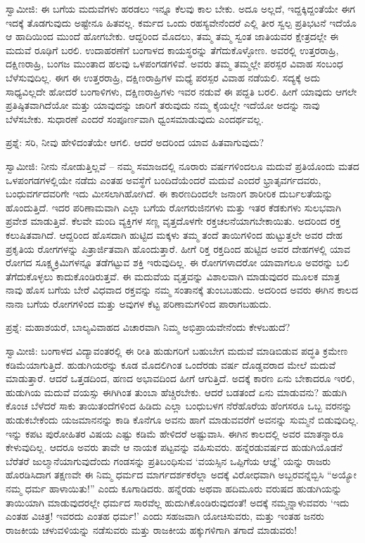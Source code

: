 ಸ್ವಾಮೀಜಿ: ಈ ಬಗೆಯ ಮದುವೆಗಳು ಹರಡಲು ಇನ್ನೂ ಕೆಲವು ಕಾಲ ಬೇಕು. ಅದೂ ಅಲ್ಲದೆ, ಇದ್ದಕ್ಕಿದ್ದಂತೆಯೇ ಈಗ ಇದಕ್ಕೆ ತೊಡಗುವುದು ಅಷ್ಟೇನೂ ಹಿತವಲ್ಲ. ಕರ್ಮದ ಒಂದು ರಹಸ್ಯವೇನೆಂದರೆ ಎಲ್ಲಿ ತೀರ ಸ್ವಲ್ಪ ಪ್ರತಿಭಟನೆ ಇದೆಯೊ ಆ ಹಾದಿಯಿಂದ ಮುಂದೆ ಹೋಗಬೇಕು. ಆದ್ದರಿಂದ ಮೊದಲು, ತಮ್ಮ ತಮ್ಮ ಸ್ವಂತ ಜಾತಿಯವರ ಕ್ಷೇತ್ರದಲ್ಲೇ ಈ ಮದುವೆ ರೂಢಿಗೆ ಬರಲಿ. ಉದಾಹರಣೆಗೆ ಬಂಗಾಳದ ಕಾಯಸ್ಥರನ್ನು ತೆಗೆದುಕೊಳ್ಳೋಣ. ಅವರಲ್ಲಿ ಉತ್ತರರಾಹ್ರಿ, ದಕ್ಷಿಣರಾಹ್ರಿ, ಬಂಗಜ ಮುಂತಾದ ಹಲವು ಒಳಪಂಗಡಗಳಿವೆ. ಅವರು ತಮ್ಮ ತಮ್ಮಲ್ಲೇ ಪರಸ್ಪರ ವಿವಾಹ ಸಂಬಂಧ ಬೆಳೆಸುವುದಿಲ್ಲ. ಈಗ ಈ ಉತ್ತರರಾಹ್ರಿ, ದಕ್ಷಿಣರಾಹ್ರಿಗಳ ಮಧ್ಯೆ ಪರಸ್ಪರ ವಿವಾಹ ನಡೆಯಲಿ. ಸದ್ಯಕ್ಕೆ ಅದು ಸಾಧ್ಯವಿಲ್ಲದೇ ಹೋದರೆ ಬಂಗಾಳಿಗಳು, ದಕ್ಷಿಣರಾಹ್ರಿಗಳು ಇವರ ನಡುವೆ ಈ ಪದ್ದತಿ ಬರಲಿ. ಹೀಗೆ ಯಾವುದು ಆಗಲೇ ಪ್ರತಿಷ್ಠಿತವಾಗಿದೆಯೋ ಮತ್ತು ಯಾವುದನ್ನು ಜಾರಿಗೆ ತರುವುದು ನಮ್ಮ ಕೈಯಲ್ಲೇ ಇದೆಯೋ ಅದನ್ನು ನಾವು ಬೆಳೆಸಬೇಕು. ಸುಧಾರಣೆ ಎಂದರೆ ಸಂಪೂರ್ಣವಾಗಿ ಧ್ವಂಸಮಾಡುವುದು ಎಂದರ್ಥವಲ್ಲ.

ಪ್ರಶ್ನೆ: ಸರಿ, ನೀವು ಹೇಳಿದಂತೆಯೇ ಆಗಲಿ. ಆದರೆ ಅದರಿಂದ ಯಾವ ಹಿತವಾಗುವುದು?

ಸ್ವಾಮೀಜಿ: ನೀನು ನೋಡುತ್ತಿಲ್ಲವೆ – ನಮ್ಮ ಸಮಾಜದಲ್ಲಿ ನೂರಾರು ವರ್ಷಗಳಿಂದಲೂ ಮದುವೆ ಪ್ರತಿಯೊಂದು ಮತದ ಒಳಪಂಗಡಗಳಲ್ಲಿಯೇ ನಡೆದು ಎಂತಹ ಅವಸ್ಥೆಗೆ ಬಂದಿದೆಯೆಂದರೆ ಮದುವೆ ಎಂದರೆ ಭ್ರಾತೃವರ್ಗದವರು, ಬಂಧುವರ್ಗದವರಿಗೇ ಇದು ಮೀಸಲಾಗಿಹೋಗಿದೆ. ಈ ಕಾರಣದಿಂದಲೇ ಜನಾಂಗ ಶಾರೀರಿಕ ದುರ್ಬಲತೆಯನ್ನು ಹೊಂದುತ್ತಿದೆ. ಇದರ ಪರಿಣಾಮವಾಗಿ ಎಲ್ಲಾ ಬಗೆಯ ರೋಗರುಜಿನಗಳು ಮತ್ತು ಇತರ ಕೆಡಕುಗಳು ಸುಲಭವಾಗಿ ಪ್ರವೇಶ ಮಾಡುತ್ತಿವೆ. ಕೆಲವೇ ಮಂದಿ ವ್ಯಕ್ತಿಗಳ ಸಣ್ಣ ವೃತ್ತದೊಳಗೇ ರಕ್ತಚಲನೆಯಾಗಬೇಕಾಯಿತು. ಅದರಿಂದ ರಕ್ತ ಕಲುಷಿತವಾಗಿದೆ. ಆದ್ದರಿಂದ ಹೊಸದಾಗಿ ಹುಟ್ಟಿದ ಮಕ್ಕಳು ತಮ್ಮ ತಂದೆ ತಾಯಿಗಳಿಂದ ಹುಟ್ಟುತ್ತಲೇ ಅವರ ದೇಹ ಪ್ರಕೃತಿಯ ರೋಗಗಳನ್ನು ಪಿತ್ರಾರ್ಜಿತವಾಗಿ ಹೊಂದುತ್ತಾರೆ. ಹೀಗೆ ರಿಕ್ತ ರಕ್ತದಿಂದ ಹುಟ್ಟಿದ ಅವರ ದೇಹಗಳಲ್ಲಿ ಯಾವ ರೋಗದ ಸೂಕ್ಷ್ಮಕ್ರಿಮಿಗಳನ್ನೂ ತಡೆಗಟ್ಟುವ ಶಕ್ತಿ ಇರುವುದಿಲ್ಲ. ಈ ರೋಗಗಳಾದರೋ ಯಾವಾಗಲೂ ಅವರನ್ನು ಬಲಿ ತೆಗೆದುಕೊಳ್ಳಲು ಕಾದುಕೊಂಡಿರುತ್ತವೆ. ಈ ಮದುವೆಯ ವೃತ್ತವನ್ನು ವಿಶಾಲವಾಗಿ ಮಾಡುವುದರ ಮೂಲಕ ಮಾತ್ರ ನಾವು ಹೊಸ ಬಗೆಯ ಬೇರೆ ವಿಧವಾದ ರಕ್ತವನ್ನು ನಮ್ಮ ಸಂತಾನಕ್ಕೆ ತುಂಬಬಹುದು. ಅದರಿಂದ ಅವರು ಈಗಿನ ಕಾಲದ ನಾನಾ ಬಗೆಯ ರೋಗಗಳಿಂದ ಮತ್ತು ಅವುಗಳ ಕೆಟ್ಟ ಪರಿಣಾಮಗಳಿಂದ ಪಾರಾಗಬಹುದು.

ಪ್ರಶ್ನೆ: ಮಹಾಶಯರೆ, ಬಾಲ್ಯವಿವಾಹದ ವಿಚಾರವಾಗಿ ನಿಮ್ಮ ಅಭಿಪ್ರಾಯವೇನೆಂದು ಕೇಳಬಹುದೆ?

ಸ್ವಾಮೀಜಿ: ಬಂಗಾಳದ ವಿದ್ಯಾವಂತರಲ್ಲಿ ಈ ರೀತಿ ಹುಡುಗರಿಗೆ ಬಹುಬೇಗ ಮದುವೆ ಮಾಡಿಬಿಡುವ ಪದ್ಧತಿ ಕ್ರಮೇಣ ಕಡಿಮೆಯಾಗುತ್ತಿದೆ. ಹುಡುಗಿಯರನ್ನು ಕೂಡ ಮೊದಲಿಗಿಂತ ಒಂದೆರಡು ವರ್ಷ ದೊಡ್ಡವರಾದ ಮೇಲೆ ಮದುವೆ ಮಾಡುತ್ತಾರೆ. ಆದರೆ ಒತ್ತಡದಿಂದ, ಹಣದ ಅಭಾವದಿಂದ ಹೀಗೆ ಆಗುತ್ತಿದೆ. ಅದಕ್ಕೆ ಕಾರಣ ಏನು ಬೇಕಾದರೂ ಇರಲಿ, ಹುಡುಗಿಯ ಮದುವೆ ವಯಸ್ಸು ಈಗಿಗಿಂತ ತುಂಬಾ ಹೆಚ್ಚಿರಬೇಕು. ಆದರೆ ಬಡತಂದೆ ಏನು ಮಾಡುವನು? ಹುಡುಗಿ ಕೊಂಚ ಬೆಳೆದರೆ ಸಾಕು ತಾಯಿತಂದೆಗಳಿಂದ ಹಿಡಿದು ಎಲ್ಲಾ ಬಂಧುಬಳಗ ನೆರೆಹೊರೆಯ ಹೆಂಗಸರೂ ಒಬ್ಬ ವರನನ್ನು ಹುಡುಕಬೇಕೆಂದು ಯಜಮಾನನನ್ನು ಕಾಡಿ ಕೊನೆಗೂ ಅವನು ಹಾಗೆ ಮಾಡುವವರೆಗೆ ಅವನನ್ನು ಸುಮ್ಮನೆ ಬಿಡುವುದಿಲ್ಲ. ಇನ್ನು ಕಪಟ ಪುರೋಹಿತರ ವಿಷಯ ಎಷ್ಟು ಕಡಿಮೆ ಹೇಳಿದರೆ ಅಷ್ಟುವಾಸಿ. ಈಗಿನ ಕಾಲದಲ್ಲಿ ಅವರ ಮಾತನ್ನಾರೂ ಕೇಳುವುದಿಲ್ಲ. ಆದರೂ ಅವರು ತಾವೇ ಆ ನಾಯಕ ಪಟ್ಟವನ್ನು ವಹಿಸುವರು. ಹನ್ನೆರಡುವರ್ಷದ ಹುಡುಗಿಯೊಡನೆ ಬೆರೆತರೆ ಜುಲ್ಮಾನೆಯಾಗುವುದೆಂದು ಗಂಡಸನ್ನು ಪ್ರತಿಬಂಧಿಸುವ ‘ವಯಸ್ಸಿನ ಒಪ್ಪಿಗೆಯ ಆಜ್ಞೆ’  ಯನ್ನು ರಾಜರು ಹೊರಡಿಸಿದಾಗ ತಕ್ಷಣವೇ ಈ ನಿಮ್ಮ ಧರ್ಮದ ಮಾರ್ಗದರ್ಶಕರೆಲ್ಲಾ ಅದಕ್ಕೆ ವಿರೋಧವಾಗಿ ಅಬ್ಬರವನ್ನೆಬ್ಬಿಸಿ “ಅಯ್ಯೋ ನಮ್ಮ ಧರ್ಮ ಹಾಳಾಯಿತು!” ಎಂದು ಕೂಗಾಡಿದರು. ಹನ್ನೆರಡು ಅಥವಾ ಹದಿಮೂರು ವರುಷದ ಹುಡುಗಿಯನ್ನು ತಾಯಿಯಾಗಿ ಮಾಡುವುದರಲ್ಲೇ ಧರ್ಮದ ಸಾರವೆಲ್ಲ ಹುದುಗಿಕೊಂಡಿರುವುದಂತೆ! ಅದಕ್ಕೆ ನಮ್ಮನ್ನಾಳುವವರು ‘ಇದು ಎಂತಹ ವಿಚಿತ್ರ! ಇವರದು ಎಂತಹ ಧರ್ಮ!’ ಎಂದು ಸಹಜವಾಗಿ ಯೋಚಿಸುವರು, ಮತ್ತು ಇಂತಹ ಜನರು ರಾಜಕೀಯ ಚಳುವಳಿಯನ್ನು ನಡೆಸುವರು ಮತ್ತು ರಾಜಕೀಯ ಹಕ್ಕುಗಳಿಗಾಗಿ ತಗಾದೆ ಮಾಡುವರು!

